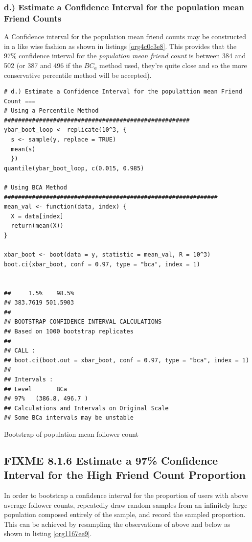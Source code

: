 \documentclass[11pt]{article}
\begin{document}
\subsubsection{d.) Estimate a Confidence Interval for the population mean Friend Counts}
\label{sec:org30ef0db}
A Confidence interval for the population mean friend counts may be constructed
in a like wise fashion as shown in listings \ref{org4c0c3e8}. This provides that the 97\%
confidence interval for the \emph{population mean friend count} is between 384 and 502
(or 387 and 496 if the \(BC_{a}\) method used, they're quite close and so the more
conservative percentile method will be accepted).

\begin{listing}[htbp]
\begin{verbatim}
# d.) Estimate a Confidence Interval for the populattion mean Friend Count ===
# Using a Percentile Method #####################################################
ybar_boot_loop <- replicate(10^3, {
  s <- sample(y, replace = TRUE)
  mean(s)
  })
quantile(ybar_boot_loop, c(0.015, 0.985)

# Using BCA Method #############################################################
mean_val <- function(data, index) {
  X = data[index]
  return(mean(X))
}

xbar_boot <- boot(data = y, statistic = mean_val, R = 10^3)
boot.ci(xbar_boot, conf = 0.97, type = "bca", index = 1)


##     1.5%    98.5%
## 383.7619 501.5903
##
## BOOTSTRAP CONFIDENCE INTERVAL CALCULATIONS
## Based on 1000 bootstrap replicates
##
## CALL :
## boot.ci(boot.out = xbar_boot, conf = 0.97, type = "bca", index = 1)
##
## Intervals :
## Level       BCa
## 97%   (386.8, 496.7 )
## Calculations and Intervals on Original Scale
## Some BCa intervals may be unstable
\end{verbatim}
\caption{\label{org4c0c3e8}Bootstrap of population mean follower count}
\end{listing}

\subsection{{\bfseries\sffamily FIXME} 8.1.6 Estimate a 97\% Confidence Interval for the High Friend Count Proportion}
\label{sec:org29a725b}
In order to bootstrap a confidence interval for the proportion of users with
above average follower counts, repeatedly draw random samples from an infinitely
large population composed entirely of the sample, and record the sampled
proportion. This can be achieved by resampling the observations of above and
below as shown in listing \ref{org1167ee9}.
\end{document}
